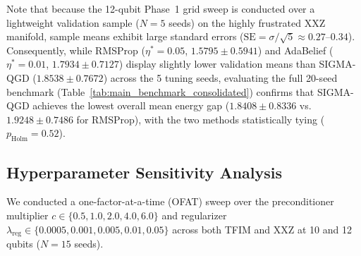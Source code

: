\documentclass[11pt,a4paper]{article}
\begin{document}
Note that because the 12-qubit Phase~1 grid sweep is conducted over a lightweight validation sample ($N=5$ seeds) on the highly frustrated XXZ manifold, sample means exhibit large standard errors ($\text{SE} = \sigma/\sqrt{5} \approx 0.27\text{--}0.34$). Consequently, while RMSProp ($\eta^*=0.05$, $1.5795 \pm 0.5941$) and AdaBelief ($\eta^*=0.01$, $1.7934 \pm 0.7127$) display slightly lower validation means than SIGMA-QGD ($1.8538 \pm 0.7672$) across the 5 tuning seeds, evaluating the full 20-seed benchmark (Table~\ref{tab:main_benchmark_consolidated}) confirms that SIGMA-QGD achieves the lowest overall mean energy gap ($1.8408 \pm 0.8336$ vs.\ $1.9248 \pm 0.7486$ for RMSProp), with the two methods statistically tying ($p_{\text{Holm}} = 0.52$).

\subsection{Hyperparameter Sensitivity Analysis}
\label{sec:sensitivity_results}
We conducted a one-factor-at-a-time (OFAT) sweep over the preconditioner multiplier $c \in \{0.5, 1.0, 2.0, 4.0, 6.0\}$ and regularizer $\lambda_{\text{reg}} \in \{0.0005, 0.001, 0.005, 0.01, 0.05\}$ across both TFIM and XXZ at 10 and 12 qubits ($N=15$ seeds).
\end{document}
